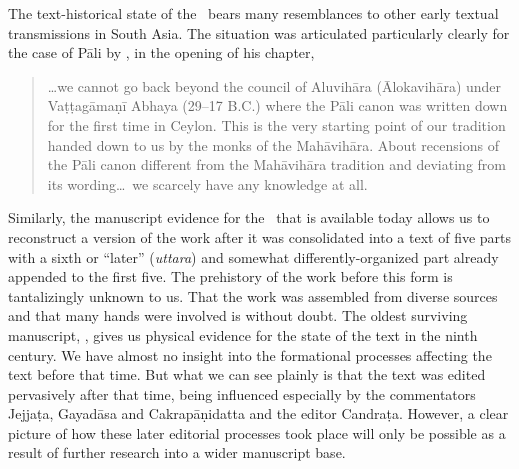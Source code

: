 The text-historical state of the \SS\ bears many resemblances to other early 
textual transmissions in South Asia.  The situation was articulated particularly 
clearly for the case of Pāli by \citet{hinu-1978}, in the opening of his chapter, 
\begin{quote}
    \ldots we cannot go back beyond the council of Aluvihāra (Ālokavihāra) under 
    Vaṭṭagāmaṇī Abhaya (29--17 B.C.) where the Pāli canon was written down for 
    the first time in Ceylon.  This is the very starting point of our tradition 
    handed down to us by the monks of the Mahāvihāra.  About recensions of 
    the Pāli canon different from the Mahāvihāra tradition and deviating from its 
    wording\ldots\ we scarcely have any knowledge at all.
\end{quote}
Similarly, the manuscript evidence for the \SS\ that is available
today allows us to reconstruct a version of the work after it was
consolidated into a text of five parts with a sixth or “later”
(\emph{uttara}) and somewhat differently-organized part already
appended to the first five.  The prehistory of the work before this
form is tantalizingly unknown to us.  That the work was assembled from
diverse sources and that many hands were involved is without doubt.
The oldest surviving manuscript, , gives us
physical evidence for the state of the text in the ninth century.  We
have almost no insight into the formational processes affecting the
text before that time.  But what we can see plainly is that the text
was edited pervasively after that time, being influenced especially by
the commentators Jejjaṭa, Gayadāsa and Cakrapāṇidatta and
the editor Candraṭa. However, a clear picture of how these later
editorial processes took place will only be possible as a result of
further research into a wider manuscript base.